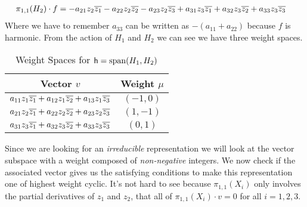 \documentclass[
	pages,
	boxes,
	color=WildStrawberry
]{homework}
\theoremstyle{plain}
\begin{document}
\begin{solution}
\begin{align*}
		\pi_{1,1}(H_2)\cdot f & =  - a_{21}z_2\overline{z_1} - a_{22}z_2\overline{z_2} - a_{23}z_2\overline{z_3} + a_{31}z_3\overline{z_1} + a_{32}z_3\overline{z_2} + a_{33}z_3\overline{z_3}
	\end{align*}
	Where we have to remember $a_{33}$ can be written as $-(a_{11} + a_{22})$ because $f$ is harmonic. From the action of $H_1$ and $H_2$ we can see we have three weight spaces.
	\begin{table}[h]
		\centering\begin{tabular}{c c}
			Vector $v$                                                        & Weight $\mu$ \\ \toprule
			$a_{11}z_1\overline{z_1} + a_{12}z_1\overline{z_2} + a_{13}z_1\overline{z_3}$ & $(-1, 0)$    \\
			$a_{21}z_2\overline{z_1} + a_{22}z_2\overline{z_2} + a_{23}z_2\overline{z_3}$ & $(1, -1)$    \\
			$a_{31}z_3\overline{z_1} + a_{32}z_3\overline{z_2} + a_{33}z_3\overline{z_3}$ & $(0, 1)$
		\end{tabular}
		\caption{Weight Spaces for $\mathsf{h} = \operatorname{span}(H_1, H_2)$}\label{tab:weightspaces}
	\end{table}
	Since we are looking for an \emph{irreducible} representation we will look at the vector subspace with a weight composed of \emph{non-negative} integers. We now check if the associated vector gives us the satisfying conditions to make this representation one of highest weight cyclic. It's not hard to see because $\pi_{1,1}(X_i)$ only involves the partial derivatives of $z_1$ and $z_2$, that all of $\pi_{1,1}(X_i)\cdot v = 0$ for all $i = 1,2,3$.


\end{solution}
\end{document}
